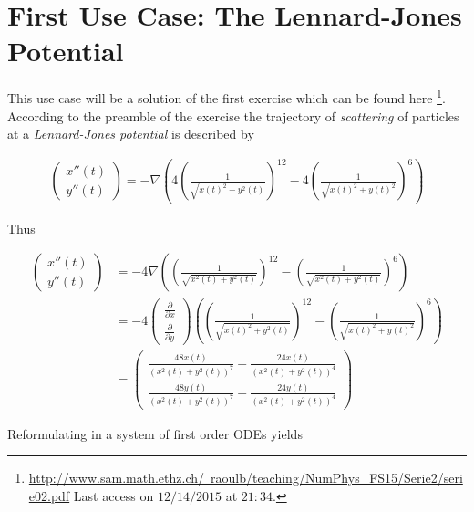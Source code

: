 \section{First Use Case: The Lennard-Jones Potential}
This use case will be a solution of the first exercise which can be found here \footnote{\href{http://www.sam.math.ethz.ch/~raoulb/teaching/NumPhys_FS15/Serie2/serie02.pdf}{http://www.sam.math.ethz.ch/~raoulb/teaching/NumPhys\_FS15/Serie2/serie02.pdf} Last access on $12/14/2015$ at $21:34$.}. According to the preamble of the exercise the trajectory of \emph{scattering} of particles at a \emph{Lennard-Jones potential} is described by 

\begin{gather}
	\boxed{\begin{pmatrix}
		x''(t)\\
		y''(t)
	\end{pmatrix} = -\nabla \left( 4 \left( \frac{1}{\sqrt{x(t)^2 + y^2(t)}} \right)^{12} - 4\left( \frac{1}{\sqrt{x(t)^2 + y(t)^2}} \right)^6 \right) }
\end{gather}

Thus

\begin{align*}
	\begin{pmatrix}
		x''(t)\\
		y''(t)
	\end{pmatrix} &= -4\nabla \left(\left( \frac{1}{\sqrt{x^2(t) + y^2(t)}} \right)^{12} - \left( \frac{1}{\sqrt{x^2(t) + y^2(t)}} \right)^6 \right)\\
	&= -4 \begin{pmatrix}
		\frac{\partial }{\partial x}\\
		\frac{\partial }{\partial y}
	\end{pmatrix}\left( \left( \frac{1}{\sqrt{x(t)^2 + y^2(t)}} \right)^{12} - \left( \frac{1}{\sqrt{x(t)^2 + y(t)^2}} \right)^6 \right)\\
	&= \begin{pmatrix}
		\frac{48x(t)}{\left( x^2(t) + y^2(t) \right)^7} - \frac{24x(t)}{\left( x^2(t) + y^2(t) \right)^4}\\
		\frac{48y(t)}{\left( x^2(t) + y^2(t) \right)^7} - \frac{24y(t)}{\left( x^2(t) + y^2(t) \right)^4}	
	\end{pmatrix}
\end{align*}

Reformulating in a system of first order ODEs yields


